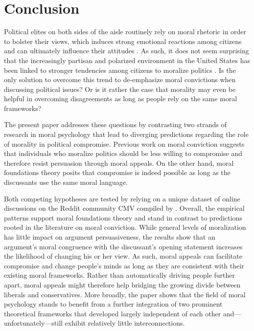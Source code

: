 


\section{Conclusion}\label{conclusion}

Political elites on both sides of the aisle routinely rely on moral rhetoric in order to bolster their views, which induces strong emotional reactions among citizens \citep{lipsitz2017playing} and can ultimately influence their attitudes \citep[e.g.,][]{clifford2013words,clifford2015concerns}. As such, it does not seem surprising that the increasingly partisan and polarized environment in the United States has been linked to stronger tendencies among citizens to moralize politics \citep{garrett2018moral}. Is the only solution to overcome this trend to de-emphasize moral convictions when discussing political issues? Or is it rather the case that morality may even be helpful in overcoming disagreements as long as people rely on the same moral frameworks?

The present paper addresses these questions by contrasting two strands of research in moral psychology that lead to diverging predictions regarding the role of morality in political compromise. Previous work on moral conviction suggests that individuals who moralize politics should be less willing to compromise and therefore resist persuasion through moral appeals. On the other hand, moral foundations theory posits that compromise is indeed possible as long as the discussants use the same moral language.

Both competing hypotheses are tested by relying on a unique dataset of online discussions on the Reddit community CMV compiled by \cite{tan2016winning}. Overall, the empirical patterns support moral foundations theory and stand in contrast to predictions rooted in the literature on moral conviction. While general levels of moralization has little impact on argument persuasiveness, the results show that an argument's moral congruence with the discussant's opening statement increases the likelihood of changing his or her view. As such, moral appeals can facilitate compromise and change people's minds as long as they are consistent with their existing moral frameworks. Rather than automatically driving people further apart, moral appeals might therefore help bridging the growing divide between liberals and conservatives. More broadly, the paper shows that the field of moral psychology stands to benefit from a further integration of two prominent theoretical frameworks that developed largely independent of each other and---unfortunately---still exhibit relatively little interconnections.


